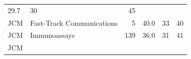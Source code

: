 \documentclass[11pt,]{article}
\begin{document}
\begin{longtable}[]{@{}llrrrr@{}}
\begin{minipage}[t]{0.08\columnwidth}
29.7\strut
\end{minipage} & \begin{minipage}[t]{0.11\columnwidth}\raggedleft\strut
30\strut
\end{minipage} & \begin{minipage}[t]{0.11\columnwidth}\raggedleft\strut
45\strut
\end{minipage}\tabularnewline
\begin{minipage}[t]{0.06\columnwidth}\raggedright\strut
JCM\strut
\end{minipage} & \begin{minipage}[t]{0.43\columnwidth}\raggedright\strut
Fast-Track Communications\strut
\end{minipage} & \begin{minipage}[t]{0.04\columnwidth}\raggedleft\strut
5\strut
\end{minipage} & \begin{minipage}[t]{0.08\columnwidth}\raggedleft\strut
40.0\strut
\end{minipage} & \begin{minipage}[t]{0.11\columnwidth}\raggedleft\strut
33\strut
\end{minipage} & \begin{minipage}[t]{0.11\columnwidth}\raggedleft\strut
40\strut
\end{minipage}\tabularnewline
\begin{minipage}[t]{0.06\columnwidth}\raggedright\strut
JCM\strut
\end{minipage} & \begin{minipage}[t]{0.43\columnwidth}\raggedright\strut
Immunoassays\strut
\end{minipage} & \begin{minipage}[t]{0.04\columnwidth}\raggedleft\strut
139\strut
\end{minipage} & \begin{minipage}[t]{0.08\columnwidth}\raggedleft\strut
36.0\strut
\end{minipage} & \begin{minipage}[t]{0.11\columnwidth}\raggedleft\strut
31\strut
\end{minipage} & \begin{minipage}[t]{0.11\columnwidth}\raggedleft\strut
41\strut
\end{minipage}\tabularnewline
\begin{minipage}[t]{0.06\columnwidth}\raggedright\strut
JCM\strut
\end{minipage} & \begin{minipage}[t]{0.43\columnwidth}\raggedright\strut

\end{minipage}
\end{longtable}
\end{document}
